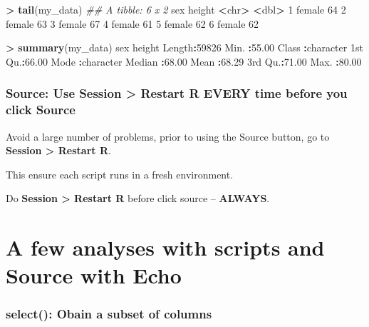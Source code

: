 \documentclass[
]{krantz}
\makeatletter
\newenvironment{Shaded}{\begin{snugshade}}{\end{snugshade}}
\newcommand{\CommentTok}[1]{\textcolor[rgb]{0.37,0.37,0.37}{\textit{#1}}}
\newcommand{\DecValTok}[1]{\textcolor[rgb]{0.06,0.06,0.06}{#1}}
\newcommand{\ErrorTok}[1]{\textcolor[rgb]{0.14,0.14,0.14}{\textbf{#1}}}
\newcommand{\FloatTok}[1]{\textcolor[rgb]{0.06,0.06,0.06}{#1}}
\newcommand{\KeywordTok}[1]{\textcolor[rgb]{0.27,0.27,0.27}{\textbf{#1}}}
\newcommand{\NormalTok}[1]{#1}
\newcommand{\OperatorTok}[1]{\textcolor[rgb]{0.43,0.43,0.43}{\textbf{#1}}}
\newcommand{\StringTok}[1]{\textcolor[rgb]{0.5,0.5,0.5}{#1}}
\newenvironment{kframe}{%
\medskip{}
\setlength{\fboxsep}{.8em}
 \def\at@end@of@kframe{}%
 \ifinner\ifhmode%
  \def\at@end@of@kframe{\end{minipage}}%
  \begin{minipage}{\columnwidth}%
 \fi\fi%
 \def\FrameCommand##1{\hskip\@totalleftmargin \hskip-\fboxsep
 \colorbox{shadecolor}{##1}\hskip-\fboxsep
     \hskip-\linewidth \hskip-\@totalleftmargin \hskip\columnwidth}%
 \MakeFramed {\advance\hsize-\width
   \@totalleftmargin\z@ \linewidth\hsize
   \@setminipage}}%
 {\par\unskip\endMakeFramed%
 \at@end@of@kframe}
\renewenvironment{Shaded}{\begin{kframe}}{\end{kframe}}
\makeatother
\begin{document}
\begin{Shaded}
\begin{Highlighting}[]
\OperatorTok{>}\StringTok{ }\KeywordTok{tail}\NormalTok{(my_data)}
\CommentTok{## A tibble: 6 x 2}
\NormalTok{  sex    height}
  \OperatorTok{<}\NormalTok{chr}\OperatorTok{>}\StringTok{   }\ErrorTok{<}\NormalTok{dbl}\OperatorTok{>}
\DecValTok{1}\NormalTok{ female     }\DecValTok{64}
\DecValTok{2}\NormalTok{ female     }\DecValTok{63}
\DecValTok{3}\NormalTok{ female     }\DecValTok{67}
\DecValTok{4}\NormalTok{ female     }\DecValTok{61}
\DecValTok{5}\NormalTok{ female     }\DecValTok{62}
\DecValTok{6}\NormalTok{ female     }\DecValTok{62}

\OperatorTok{>}\StringTok{ }\KeywordTok{summary}\NormalTok{(my_data)}
\NormalTok{     sex                height     }
\NormalTok{ Length}\OperatorTok{:}\DecValTok{59826}\NormalTok{       Min.   }\OperatorTok{:}\FloatTok{55.00}  
\NormalTok{ Class }\OperatorTok{:}\NormalTok{character   1st Qu.}\OperatorTok{:}\FloatTok{66.00}  
\NormalTok{ Mode  }\OperatorTok{:}\NormalTok{character   Median }\OperatorTok{:}\FloatTok{68.00}  
\NormalTok{                    Mean   }\OperatorTok{:}\FloatTok{68.29}  
\NormalTok{                    3rd Qu.}\OperatorTok{:}\FloatTok{71.00}  
\NormalTok{                    Max.   }\OperatorTok{:}\FloatTok{80.00}  
\end{Highlighting}
\end{Shaded}

\hypertarget{source-use-session-restart-r-every-time-before-you-click-source}{%
\subsubsection{Source: Use Session \textgreater{} Restart R EVERY time before you click Source}\label{source-use-session-restart-r-every-time-before-you-click-source}}

Avoid a large number of problems, prior to using the Source button, go to \textbf{Session \textgreater{} Restart R}.

This ensure each script runs in a fresh environment.

Do \textbf{Session \textgreater{} Restart R} before click source -- \textbf{ALWAYS}.

\hypertarget{a-few-analyses-with-scripts-and-source-with-echo}{%
\section{A few analyses with scripts and Source with Echo}\label{a-few-analyses-with-scripts-and-source-with-echo}}

\hypertarget{select-obain-a-subset-of-columns}{%
\subsubsection{select(): Obain a subset of columns}\label{select-obain-a-subset-of-columns}}
\end{document}
